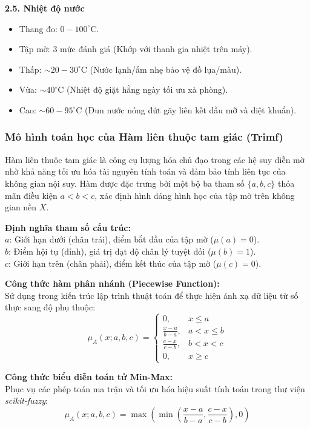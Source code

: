 \documentclass[12pt, a4paper]{article}
\begin{document}
\textbf{2.5. Nhiệt độ nước}
\begin{itemize}
    \item Thang đo: $0 - 100^\circ$C.
    \item Tập mờ: 3 mức đánh giá (Khớp với thanh gia nhiệt trên máy).
    \item Thấp: $\sim 20 - 30^\circ$C (Nước lạnh/ấm nhẹ bảo vệ đồ lụa/màu).
    \item Vừa: $\sim 40^\circ$C (Nhiệt độ giặt hằng ngày tối ưu xà phòng).
    \item Cao: $\sim 60 - 95^\circ$C (Đun nước nóng đứt gãy liên kết dầu mỡ và diệt khuẩn).
\end{itemize}

\subsubsection{Mô hình toán học của Hàm liên thuộc tam giác (Trimf)}
Hàm liên thuộc tam giác là công cụ lượng hóa chủ đạo trong các hệ suy diễn mờ nhờ khả năng tối ưu hóa tài nguyên tính toán và đảm bảo tính liên tục của không gian nội suy. Hàm được đặc trưng bởi một bộ ba tham số $\{a, b, c\}$ thỏa mãn điều kiện $a < b < c$, xác định hình dáng hình học của tập mờ trên không gian nền $X$.

\textbf{Định nghĩa tham số cấu trúc:}\\
$a$: Giới hạn dưới (chân trái), điểm bắt đầu của tập mờ ($\mu(a) = 0$).\\
$b$: Điểm hội tụ (đỉnh), giá trị đạt độ chân lý tuyệt đối ($\mu(b) = 1$).\\
$c$: Giới hạn trên (chân phải), điểm kết thúc của tập mờ ($\mu(c) = 0$).

\textbf{Công thức hàm phân nhánh (Piecewise Function):}\\
Sử dụng trong kiến trúc lập trình thuật toán để thực hiện ánh xạ dữ liệu từ số thực sang độ phụ thuộc:
\begin{equation}
\mu_A(x; a, b, c) = 
\begin{cases} 
0, & x \le a \\ 
\frac{x-a}{b-a}, & a < x \le b \\ 
\frac{c-x}{c-b}, & b < x < c \\ 
0, & x \ge c 
\end{cases}
\end{equation}

\textbf{Công thức biểu diễn toán tử Min-Max:}\\
Phục vụ các phép toán ma trận và tối ưu hóa hiệu suất tính toán trong thư viện \textit{scikit-fuzzy}:
\begin{equation}
\mu_A(x; a, b, c) = \max \left( \min \left( \frac{x - a}{b - a}, \frac{c - x}{c - b} \right), 0 \right)
\end{equation}
\end{document}
